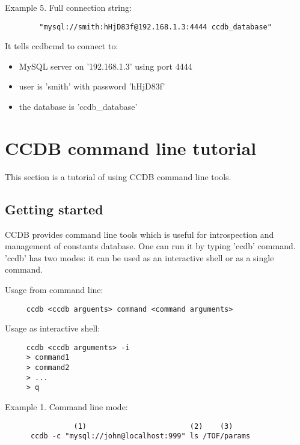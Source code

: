 \documentclass{article}
\begin{document}
Example 5. Full connection string:
\begin{verbatim}	
        "mysql://smith:hHjD83f@192.168.1.3:4444 ccdb_database"
\end{verbatim}

It tells ccdbcmd to connect to:
\begin{itemize}
  \item MySQL server  on '192.168.1.3' using port 4444
  \item user is 'smith' with password 'hHjD83f'
  \item the database is 'ccdb\_database'
\end{itemize}


\newpage
\section{CCDB command line tutorial}\label{sec:console_tools_tutorial}

This section is a tutorial of using CCDB command line tools.


\subsection {Getting started}

CCDB provides command line tools which is useful for introspection and 
management of constants database. One can run it by typing 'ccdb' command.
'ccdb' has two modes: it can be used as an interactive shell or as 
a single command.
\vspace{1 em}


Usage from command line:
\begin{verbatim}
     ccdb <ccdb arguents> command <command arguments>
\end{verbatim}
\vspace{1 em}

Usage as interactive shell:
\begin{verbatim}
     ccdb <ccdb arguments> -i
     > command1
     > command2
     > ...
     > q
\end{verbatim}
\vspace{1 em}


Example 1. Command line mode:
\begin{verbatim}
                (1)                        (2)    (3)
      ccdb -c "mysql://john@localhost:999" ls /TOF/params

\end{verbatim}
\vspace{1 em}
\end{document}

